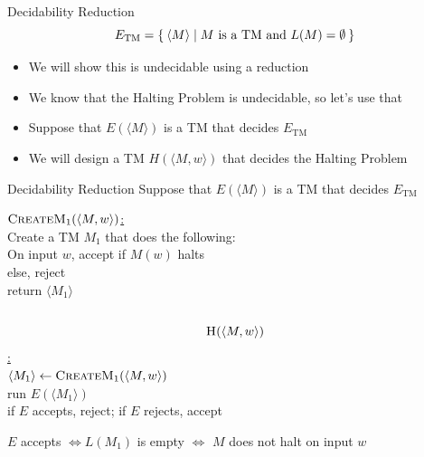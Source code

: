 \documentclass[aspectratio=169]{beamer}
\begin{document}
\begin{frame}{Decidability Reduction}
    $$E_{\text{TM}} = \Set{\langle M \rangle | M \text{ is a TM and } L(M) = \emptyset}$$ \pause
    \begin{itemize}
        \item We will show this is undecidable using a reduction \pause
        \item We know that the Halting Problem is undecidable, so let's use that \pause
        \item Suppose that $E(\langle M \rangle)$ is a TM that decides $E_{\text{TM}}$
        \item We will design a TM $H(\langle M, w \rangle)$ that decides the Halting Problem
    \end{itemize}
\end{frame}

\begin{frame}{Decidability Reduction}
    Suppose that $E(\langle M \rangle)$ is a TM that decides $E_{\text{TM}}$
    \begin{algo}
        \underline{$\textsc{CreateM}_1(\langle M, w\rangle)$:}\+
    \\      Create a TM $M_1$ that does the following:\+
    \\          On input $w$, accept if $M(w)$ halts
    \\          else, reject\-
    \\      return $\langle M_1 \rangle$\-\-
    \\
    \\  \underline{$$\textsc{H}(\langle M, w\rangle)$$:}\+
    \\      $\langle M_1 \rangle \gets \textsc{CreateM}_1(\langle M, w \rangle)$
    \\      run $E(\langle M_1 \rangle)$
    \\      if $E$ accepts, reject; if $E$ rejects, accept
    \end{algo} \pause
    $E$ accepts \pause $\iff L(M_1)$ is empty \pause $\iff$ $M$ does not halt on input $w$
\end{frame}
\end{document}
